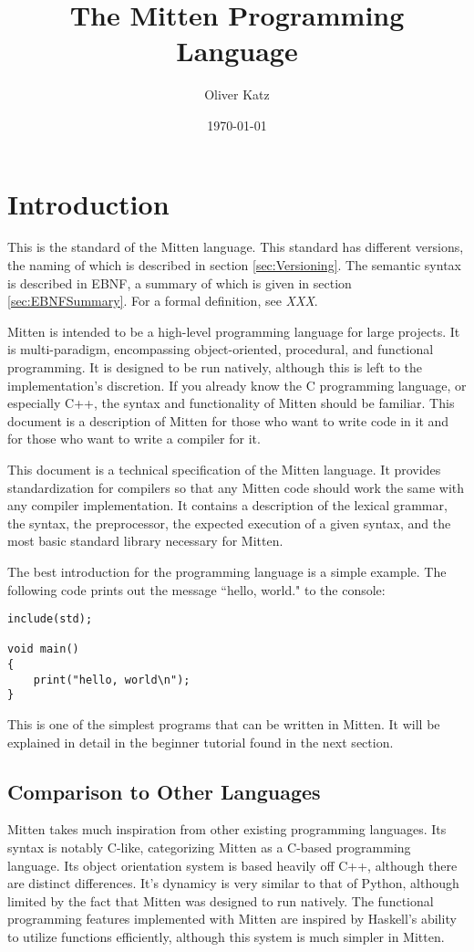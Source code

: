 \documentclass[10pt,a4paper]{article}
\title{The Mitten Programming Language}
\author{Oliver Katz}
\date{\today}
\begin{document}
\maketitle
\tableofcontents
\newpage

\section{Introduction}
This is the standard of the Mitten language. This standard has different versions, the naming of which is described in section \ref{sec:Versioning}. The semantic syntax is described in EBNF, a summary of which is given in section \ref{sec:EBNFSummary}. For a formal definition, see \textit{XXX}.

Mitten is intended to be a high-level programming language for large projects. It is multi-paradigm, encompassing object-oriented, procedural, and functional programming. It is designed to be run natively, although this is left to the implementation's discretion. If you already know the C programming language, or especially C++, the syntax and functionality of Mitten should be familiar. This document is a description of Mitten for those who want to write code in it and for those who want to write a compiler for it.

This document is a technical specification of the Mitten language. It provides standardization for compilers so that any Mitten code should work the same with any compiler implementation. It contains a description of the lexical grammar, the syntax, the preprocessor, the expected execution of a given syntax, and the most basic standard library necessary for Mitten.

The best introduction for the programming language is a simple example. The following code prints out the message ``hello, world." to the console:
\begin{verbatim}
include(std);

void main()
{
    print("hello, world\n");
}
\end{verbatim}

This is one of the simplest programs that can be written in Mitten. It will be explained in detail in the beginner tutorial found in the next section.

\subsection{Comparison to Other Languages}
Mitten takes much inspiration from other existing programming languages. Its syntax is notably C-like, categorizing Mitten as a C-based programming language. Its object orientation system is based heavily off C++, although there are distinct differences. It's dynamicy is very similar to that of Python, although limited by the fact that Mitten was designed to run natively. The functional programming features implemented with Mitten are inspired by Haskell's ability to utilize functions efficiently, although this system is much simpler in Mitten.
\end{document}
